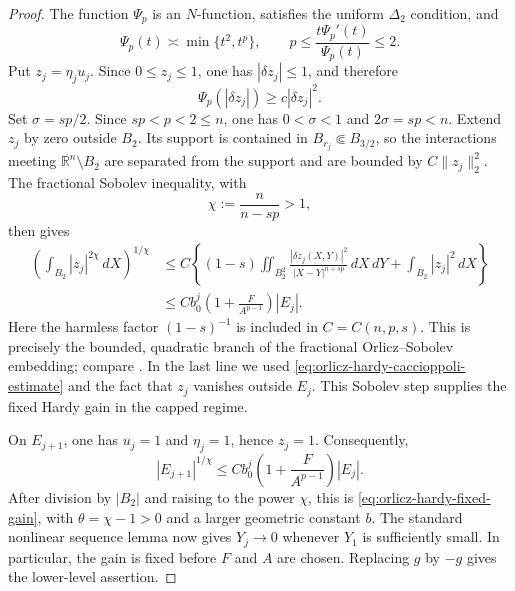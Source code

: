 \documentclass[11pt,reqno]{amsart}
\numberwithin{equation}{section}
\newcommand{\R}{\mathbb R}
\newcommand{\dd}{\,d}
\theoremstyle{remark}
\begin{document}
\begin{proof}
The function \(\Psi_p\) is an \(N\)-function, satisfies the uniform
\(\Delta_2\) condition, and
\begin{equation}
 \Psi_p(t)\asymp\min\{t^2,t^p\},
 \qquad
 p\le\frac{t\Psi_p'(t)}{\Psi_p(t)}\le2.
 \label{eq:orlicz-two-indices}
\end{equation}
Put \(z_j=\eta_ju_j\).  Since \(0\le z_j\le1\), one has
\(|\delta z_j|\le1\), and therefore
\[
 \Psi_p(|\delta z_j|)\ge c|\delta z_j|^2.
\]
Set \(\sigma=sp/2\).  Since \(sp<p<2\le n\), one has
\(0<\sigma<1\) and \(2\sigma=sp<n\).  Extend \(z_j\) by zero outside
\(B_2\).  Its support is contained in \(B_{r_j}\Subset B_{3/2}\), so
the interactions meeting \(\R^n\setminus B_2\) are separated from the
support and are bounded by \(C\|z_j\|_2^2\).  The fractional Sobolev
inequality, with
\[
 \chi:=\frac{n}{n-sp}>1,
\]
then gives
\begin{align*}
 \left(\int_{B_2}|z_j|^{2\chi}\dd X\right)^{1/\chi}
 &\le C\left\{(1-s)\iint_{B_2^2}
 \frac{|\delta z_j(X,Y)|^2}{|X-Y|^{n+sp}}\dd X\!\dd Y
 +\int_{B_2}|z_j|^2\dd X\right\}\\
 &\le Cb_0^j\left(1+\frac{F}{A^{p-1}}\right)|E_j|.
\end{align*}
Here the harmless factor \((1-s)^{-1}\) is included in
\(C=C(n,p,s)\).  This is precisely the bounded, quadratic branch of
the fractional Orlicz--Sobolev embedding; compare
\cite[Theorems~5.1 and~6.1]{AlbericoCianchiPickSlavikova}.  In the last
line we used \eqref{eq:orlicz-hardy-caccioppoli-estimate} and the fact
that \(z_j\) vanishes outside \(E_j\).
This Sobolev step supplies the fixed Hardy gain in the capped regime.

On \(E_{j+1}\), one has \(u_j=1\) and \(\eta_j=1\), hence \(z_j=1\).
Consequently,
\[
 |E_{j+1}|^{1/\chi}
 \le Cb_0^j\left(1+\frac{F}{A^{p-1}}\right)|E_j|.
\]
After division by \(|B_2|\) and raising to the power \(\chi\), this is
\eqref{eq:orlicz-hardy-fixed-gain}, with
\(\theta=\chi-1>0\) and a larger geometric constant \(b\).
The standard nonlinear sequence lemma now gives \(Y_j\to0\) whenever
\(Y_1\) is sufficiently small.  In particular, the gain is fixed
before \(F\) and \(A\) are chosen.  Replacing \(g\) by \(-g\) gives
the lower-level assertion.
\end{proof}
\end{document}
